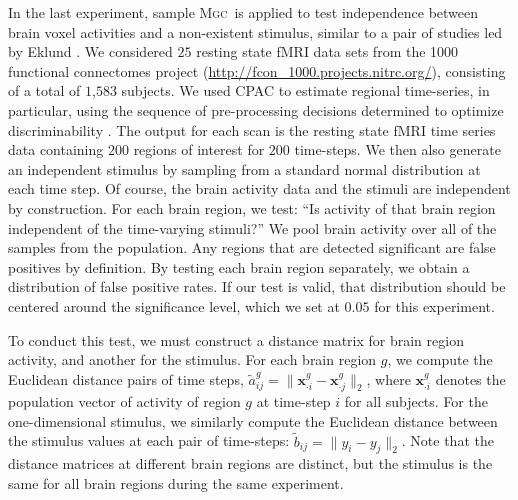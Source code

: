 \documentclass[11pt]{article}
\providecommand{\sct}[1]{{\normalfont\textsc{#1}}}
\providecommand{\mb}[1]{\boldsymbol{#1}}
\newcommand{\Mgc}{\sct{Mgc}}
\begin{document}
In the last experiment, sample \Mgc~is applied to test independence between brain voxel activities and a non-existent stimulus, similar to a pair of studies led by Eklund  \cite{EklundKnutsson2012,Eklund2015}. We considered $25$ resting state fMRI data sets from the 1000 functional connectomes project (\url{http://fcon_1000.projects.nitrc.org/}), consisting of a total of $1$,$583$ subjects.
We used CPAC to estimate regional time-series, in particular, using the sequence of pre-processing decisions determined to optimize discriminability \cite{Wang2016}.  The output for each scan is the resting state fMRI time series data containing $200$ regions of interest for $200$ time-steps.
%
%
%
We then also generate an independent stimulus  by sampling from a standard normal distribution at each time step.  Of course, the brain activity data and the stimuli are independent by construction.
For each brain region, we test: ``Is activity of that  brain region independent of the time-varying stimuli?'' We pool brain activity over all of the samples from the population.
Any regions that are detected significant are false positives by definition.  By testing each brain region separately, we obtain a distribution of false positive rates.  If our test is valid, that distribution should be centered around the significance level, which we set at $0.05$ for this experiment.

To conduct this test, we must construct a distance matrix for brain region activity, and another for the stimulus. For each brain region $g$, we compute the Euclidean distance pairs of time steps,  $\tilde{a}_{ij}^g=\|\mb{x}_{\cdot i}^g-\mb{x}_{\cdot j}^g\|_2$,  where $\mb{x}_{\cdot i}^g$ denotes the population vector of activity of region $g$ at time-step $i$ for all subjects.
For the one-dimensional stimulus, we similarly compute the Euclidean distance between the stimulus values at each pair of time-steps: $\tilde{b}_{ij}= \|y_i - y_j\|_2$.
Note that the distance matrices at different brain regions are distinct, but the stimulus is the same for all brain regions during the same experiment.

\end{document}
